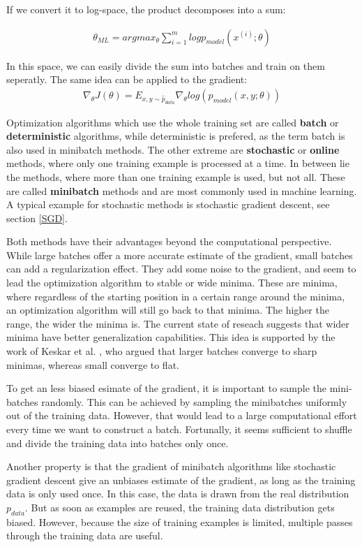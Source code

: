 If we convert it to log-space, the product decomposes into a sum:

\begin{align}
    \theta_{ML} = argmax_{\theta} \sum_{i=1}^m log p_{model}(x^{(i)}; \theta)
\end{align}

In this space, we can easily divide the sum into batches and train on them
seperatly. The same idea can be applied to the gradient:
\begin{align}
    \nabla_\theta J(\theta)=E_{x,y\sim \hat{p}_{data}} \nabla_\theta log(p_{model}(x,y;\theta))
\end{align}

Optimization algorithms which use the whole training set are called
\textbf{batch} or \textbf{deterministic} algorithms, while deterministic is
prefered, as the term batch is also used in minibatch methods. The other extreme
are \textbf{stochastic} or \textbf{online} methods, where only one training
example is processed at a time. In between lie the methods, where more than one
training example is used, but not all. These are called \textbf{minibatch}
methods and are most commonly used in machine learning. A typical example for
stochastic methods is stochastic gradient descent, see section \ref{SGD}.


Both methods have their advantages beyond the computational perspective. While
large batches offer a more accurate estimate of the gradient, small batches can
add a regularization effect. They add some noise to the gradient, and seem to
lead the optimization algorithm to stable or wide minima. These are minima,
where regardless of the starting position in a certain range around the minima,
an optimization algorithm will still go back to that minima. The higher the
range, the wider the minima is. The current state of reseach suggests that wider
minima have better generalization capabilities. This idea is supported by the
work of Keskar et al. \cite{keskar2016large}, who argued that larger batches
converge to sharp minimas, whereas small converge to flat.

To get an less biased esimate of the gradient, it is important to sample the
mini-batches randomly. This can be achieved by sampling the minibatches
uniformly out of the training data. However, that would lead to a large
computational effort every time we want to construct a batch. Fortunally, it
seems sufficient to shuffle and divide the training data into batches only once.

Another property is that the gradient of minibatch algorithms like stochastic
gradient descent give an unbiases estimate of the gradient, as long as the
training data is only used once. In this case, the data is drawn from the real
distribution $p_{data}$. But as soon as examples are reused, the training data
distribution gets biased. However, because the size of training examples is limited,
multiple passes through the training data are useful.


